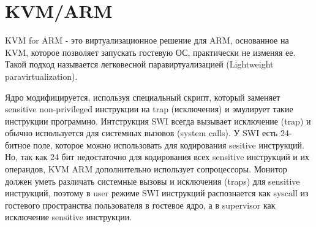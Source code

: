 \section{KVM/ARM}

KVM for ARM - это виртуализационное решение для ARM, основанное на KVM, которое позволяет запускать гостевую ОС, практически не изменяя ее. Такой подход называется легковесной паравиртуализацией (Lightweight paravirtualization). 

Ядро модифицируется, используя специальный скрипт, который заменяет sensitive non-privileged инструкции на trap (исключения) и эмулирует такие инструкции программно. Интструкция SWI всегда вызывает исключение (trap) и обычно используется для системных вызовов (system calls). У SWI есть 24-битное поле, которое можно использовать для кодирования sesitive инструкций. Но, так как 24 бит недостаточно для кодирования всех sensitive инструкций и их операндов, KVM ARM дополнительно использует сопроцессоры. Монитор должен уметь различать системные вызовы и исключения (traps) для sensitive инструкций, поэтому в user режиме SWI инструкций распознается как syscall из гостевого пространства пользователя в гостевое ядро, а в supervisor как исключение sensitive инструкции.

 
